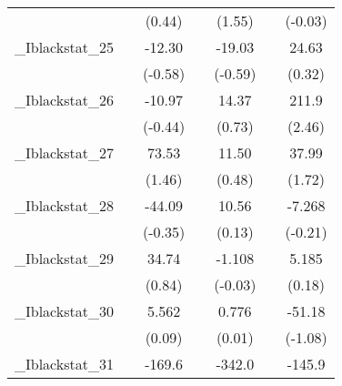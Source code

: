 {\begin{tabular}{l*{6}{c}}
            &                     &      (0.44)         &                     &      (1.55)         &                     &     (-0.03)         \\
[1em]
\_Iblackstat\_25&                     &      -12.30         &                     &      -19.03         &                     &       24.63         \\
            &                     &     (-0.58)         &                     &     (-0.59)         &                     &      (0.32)         \\
[1em]
\_Iblackstat\_26&                     &      -10.97         &                     &       14.37         &                     &       211.9\sym{*}  \\
            &                     &     (-0.44)         &                     &      (0.73)         &                     &      (2.46)         \\
[1em]
\_Iblackstat\_27&                     &       73.53         &                     &       11.50         &                     &       37.99         \\
            &                     &      (1.46)         &                     &      (0.48)         &                     &      (1.72)         \\
[1em]
\_Iblackstat\_28&                     &      -44.09         &                     &       10.56         &                     &      -7.268         \\
            &                     &     (-0.35)         &                     &      (0.13)         &                     &     (-0.21)         \\
[1em]
\_Iblackstat\_29&                     &       34.74         &                     &      -1.108         &                     &       5.185         \\
            &                     &      (0.84)         &                     &     (-0.03)         &                     &      (0.18)         \\
[1em]
\_Iblackstat\_30&                     &       5.562         &                     &       0.776         &                     &      -51.18         \\
            &                     &      (0.09)         &                     &      (0.01)         &                     &     (-1.08)         \\
[1em]
\_Iblackstat\_31&                     &      -169.6         &                     &      -342.0\sym{**} &                     &      -145.9         \\

\end{tabular}}
